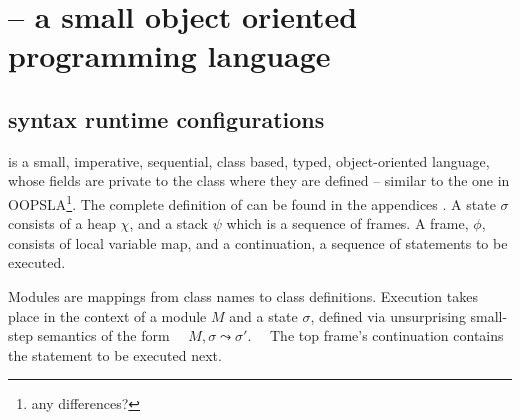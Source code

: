 
\section{\LangOO -- a small  object oriented programming language}

\subsection{\LangOO syntax runtime configurations}
\label{sub:Loo} 
 \LangOO  is a {small}, imperative, sequential, 
class based, typed, object-oriented language, whose
fields are private to the class where they are defined -- similar to the one in OOPSLA\footnote{any differences?}.
The complete definition of \LangOO  
{can be found in the appendices  \cite{necessityFull}.}
 A \LangOO state $\sigma$ consists of a 
heap $\chi$, and a  {stack $\psi$ which is a sequence of frames}.
A frame, $\phi$, consists of
local variable map, and a continuation, \ie a sequence of statements to be executed.
 
Modules are mappings from class names to class definitions. 
Execution takes place in the context of  a module $M$ and   a state $\sigma$,
 defined via unsurprising small-step semantics of the form \ \ 
   $M, \sigma \leadsto \sigma'$. \ \
The   top frame's continuation contains the statement to be 
executed next.  

\newcommand{\Push}[4]{\ensuremath{(\overline{#1 \mapsto #2}, #3)\!\triangleright\! #4}}

